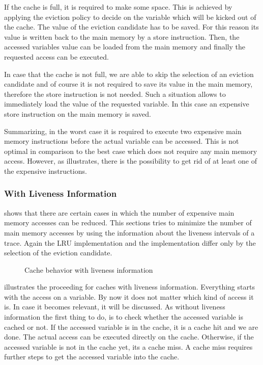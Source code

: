 \documentclass[onecolumn, openright, master, english, signatures]{dbrgrptt}
\begin{document}
If the cache is full, it is required to make some space.
This is achieved by applying the eviction policy to decide on the variable which will be kicked out of the cache.
The value of the eviction candidate has to be saved.
For this reason its value is written back to the main memory by a store instruction.
Then, the accessed variables value can be loaded from the main memory and finally the requested access can be executed.

In case that the cache is not full, we are able to skip the selection of an eviction candidate and of course it is not required to save its value in the main memory, therefore the store instruction is not needed.
Such a situation allows to immediately load the value of the requested variable.
In this case an expensive store instruction on the main memory is saved.

Summarizing, in the worst case it is required to execute two expensive main memory instructions before the actual variable can be accessed.
This is not optimal in comparison to the best case which does not require any main memory access.
However, as  illustrates, there is the possibility to get rid of at least one of the expensive instructions.

\subsubsection{With Liveness Information}\label{ssec:cache-behavior-liveness}

 shows that there are certain cases in which the number of expensive main memory accesses can be reduced.
This sections tries to minimize the number of main memory accesses by using the information about the liveness intervals of a \ac{trace}.
Again the \ac{LRU} implementation and the  implementation differ only by the selection of the eviction candidate.

\begin{figure}[!ht]
  \centering
  \scalebox{0.8}{}
  \caption{Cache behavior with liveness information}
  \label{fig:cache-behavior-liveness}
\end{figure}

 illustrates the proceeding for caches with liveness information.
Everything starts with the access on a variable.
By now it does not matter which kind of access it is.
In case it becomes relevant, it will be discussed.
As without liveness information the first thing to do, is to check whether the accessed variable is cached or not.
If the accessed variable is in the cache, it is a cache hit and we are done.
The actual access can be executed directly on the cache.
Otherwise, if the accessed variable is not in the cache yet, its a cache miss.
A cache miss requires further steps to get the accessed variable into the cache.
\end{document}
